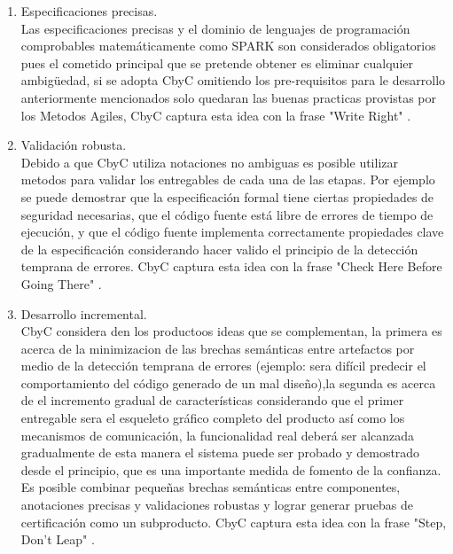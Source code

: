 \documentclass[runningheads,a4paper]{llncs}
\begin{document}
\begin{enumerate}
	\item Especificaciones precisas.\\
	
	Las especificaciones precisas y el dominio de lenguajes de programación comprobables matemáticamente como
	\gls{SPARK} son considerados obligatorios pues el cometido principal que se pretende obtener es eliminar
	cualquier ambigüedad, si se adopta \gls{CbyC} omitiendo los pre-requisitos para le desarrollo
	anteriormente mencionados solo quedaran las buenas practicas provistas por los \gls{Metodos Agiles},
	\gls{CbyC} captura esta idea con la frase "Write Right" \cite{CbyCIntroduction}.\\

	\item Validación robusta.\\
	
	Debido a que \gls{CbyC} utiliza notaciones no ambiguas es posible utilizar metodos para validar los
entregables de cada una de las etapas. Por ejemplo se puede demostrar que la especificación formal tiene
ciertas propiedades de seguridad necesarias, que el código fuente está libre de errores de tiempo de
ejecución, y que el código fuente implementa correctamente propiedades clave de la especificación
considerando hacer valido el principio de la detección temprana de errores. \gls{CbyC} captura esta idea
con la frase "Check Here Before Going There" \cite{CbyCIntroduction}.\\
	
	\item Desarrollo incremental.\\
	
	\gls{CbyC} considera den los productoos ideas que se complementan, la primera es acerca de la minimizacion de las
brechas semánticas entre artefactos por medio de la detección temprana de errores (ejemplo: sera difícil
predecir el comportamiento del código generado de un mal diseño),la segunda es acerca de el incremento
gradual de características considerando que el primer entregable sera el esqueleto gráfico completo del
producto así como los mecanismos de comunicación, la funcionalidad real deberá ser alcanzada gradualmente
de esta manera el sistema puede ser probado y demostrado desde el principio, que es una importante medida
de fomento de la confianza. Es posible combinar pequeñas brechas semánticas entre componentes,
anotaciones precisas y validaciones robustas y lograr generar pruebas de certificación como un subproducto.  \gls{CbyC} captura esta idea con la frase "Step, Don’t Leap" \cite{CbyCIntroduction}.\\


\end{enumerate}
\end{document}
